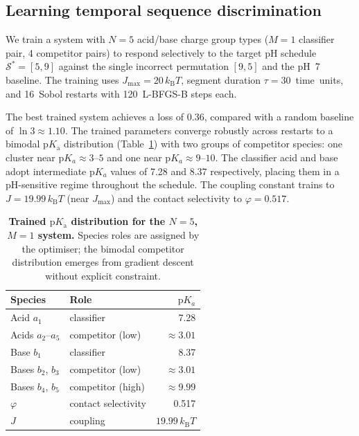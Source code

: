 \documentclass[10pt,twocolumn]{article}
\begin{document}
\subsection{Learning temporal sequence discrimination}

We train a system with $N=5$ acid/base charge group types ($M=1$ classifier pair, 4 competitor pairs) to respond selectively to the target pH schedule $\mathcal{S}^* = [5, 9]$ against the single incorrect permutation $[9, 5]$ and the pH~7 baseline.
The training uses $J_{\max} = 20\,k_\mathrm{B}T$, segment duration $\tau = 30$~time~units, and 16~Sobol restarts with 120~L-BFGS-B steps each.

The best trained system achieves a loss of 0.36, compared with a random baseline of $\ln 3 \approx 1.10$.
The trained parameters converge robustly across restarts to a bimodal $\mathrm{p}K_\mathrm{a}$ distribution (Table~\ref{tab:pKa}) with two groups of competitor species: one cluster near $\mathrm{p}K_a \approx 3$--$5$ and one near $\mathrm{p}K_a \approx 9$--$10$.
The classifier acid and base adopt intermediate $\mathrm{p}K_a$ values of 7.28 and 8.37 respectively, placing them in a pH-sensitive regime throughout the schedule.
The coupling constant trains to $J = 19.99\,k_\mathrm{B}T$ (near $J_{\max}$) and the contact selectivity to $\varphi = 0.517$.

\begin{table}[H]
  \centering
  \small
  \caption{\textbf{Trained $\mathrm{p}K_\mathrm{a}$ distribution for the
    $N=5$, $M=1$ system.}
    Species roles are assigned by the optimiser; the bimodal competitor
    distribution emerges from gradient descent without explicit constraint.}
  \label{tab:pKa}
  \begin{tabular}{llr}
    \toprule
    Species & Role & $\mathrm{p}K_a$ \\
    \midrule
    Acid $a_1$ & classifier & 7.28 \\
    Acids $a_2$--$a_5$ & competitor (low) & $\approx 3.01$ \\
    Base $b_1$ & classifier & 8.37 \\
    Bases $b_2$, $b_3$ & competitor (low) & $\approx 3.01$ \\
    Bases $b_4$, $b_5$ & competitor (high) & $\approx 9.99$ \\
    \midrule
    $\varphi$ & contact selectivity & 0.517 \\
    $J$ & coupling & $19.99\,k_\mathrm{B}T$ \\
    \bottomrule
  \end{tabular}
\end{table}
\end{document}
